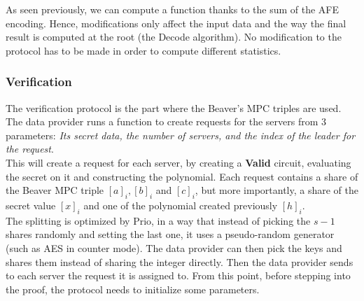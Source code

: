 \documentclass{article}
\begin{document}
As seen previously, we can compute a function thanks to the sum of the AFE encoding. Hence, modifications only affect the input data and the way the final result is computed at the root (the Decode algorithm). No modification to the protocol has to be made in order to compute different statistics.

\subsubsection*{Verification}
The verification protocol is the part where the Beaver's MPC triples are used. The data provider runs a function to create requests for the servers from 3 parameters: \textit{Its secret data, the number of servers, and the index of the leader for the request}.\\
This will create a request for each server, by creating a \textbf{Valid} circuit, evaluating the secret on it and constructing the polynomial. Each request contains a share of the Beaver MPC triple $[a]_i, [b]_i $ and $ [c]_i$, but more importantly, a share of the secret value $[x]_i$ and one of the polynomial created previously $[h]_i$.\\

The splitting is optimized by Prio, in a way that instead of picking the $s-1$ shares randomly and setting the last one, it uses a pseudo-random generator (such as AES in counter mode). The data provider can then pick the keys and shares them instead of sharing the integer directly.
Then the data provider sends to each server the request it is assigned to. From this point, before stepping into the proof, the protocol needs to initialize some parameters.\\
\end{document}
